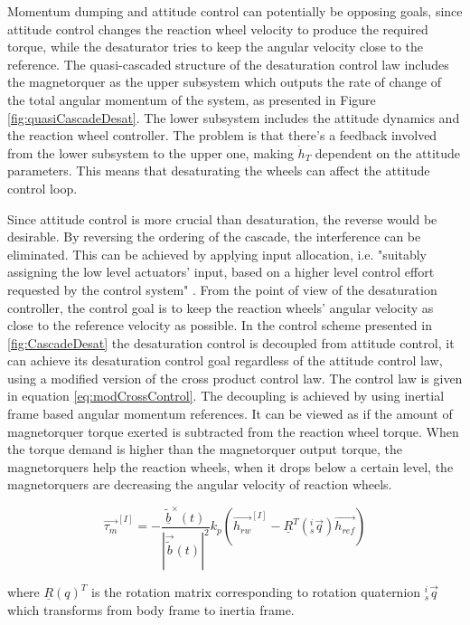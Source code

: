 Momentum dumping and attitude control can potentially be opposing goals, since attitude control changes the reaction wheel velocity to produce the required torque, while the desaturator tries to keep the angular velocity close to the reference. The quasi-cascaded structure of the desaturation control law includes the magnetorquer as the upper subsystem which outputs the rate of change of the total angular momentum of the system, as presented in Figure \ref{fig:quasiCascadeDesat}. The lower subsystem includes the attitude dynamics and the reaction wheel controller. The problem is that there's a feedback involved from the lower subsystem to the upper one, making $\dot{h}_T$ dependent on the attitude parameters. This means that desaturating the wheels can affect the attitude control loop. 

Since attitude control is more crucial than desaturation, the reverse would be desirable.  By reversing the ordering of the cascade, the interference can be eliminated. This can be achieved by applying input allocation, i.e. "suitably assigning the low level actuators' input, based on a higher level control effort requested by the control system" \cite{JOHANSEN20131087}. From the point of view of the desaturation controller, the control goal is to keep the reaction wheels' angular velocity as close to the reference velocity as possible. In the control scheme presented in \ref{fig:CascadeDesat} the desaturation control is decoupled from attitude control, it can achieve its desaturation control goal regardless of the attitude control law, using a modified version of the cross product control law. The control law is given in equation \ref{eq:modCrossControl}. The decoupling is achieved by using inertial frame based angular momentum references. 		
It can be viewed as if the amount of magnetorquer torque exerted is subtracted from the reaction wheel torque. When the torque demand is higher than the magnetorquer output torque, the magnetorquers help the reaction wheels, when it drops below a certain level, the magnetorquers are decreasing the angular velocity of reaction wheels.

		
		\begin{equation}
		\label{eq:modCrossControl}
		\vec{\tau_m}^{[I]} = -\frac{\underline{\tilde{b}}^\times(t)}{|\vec{\tilde{b}}(t) |^2} k_p\left(\vec{h_{rw}}^{[I]} - \underline{R}^T(^i_s\vec{ q})\vec{h_{ref}} \right)
		\end{equation}
		
		where $\underline{R}(q)^T$ is the rotation matrix corresponding to rotation quaternion $^i_s\vec{ q}$ which transforms from body frame to inertia frame.
		
